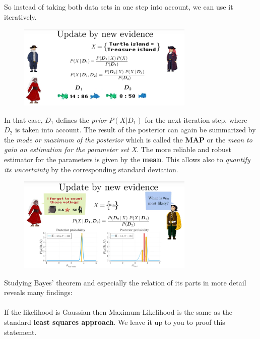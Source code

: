 \documentclass[12pt, a4paper]{scrartcl}
\begin{document}
So instead of taking both data sets in one step into account, we can use it
iteratively. %
 \begin{figure}[H]
	\centering
	\includegraphics[width=0.75\textwidth]{6_13.png}
\end{figure}
In that case, $D_1$ deﬁnes the \textit{prior} $P(X|D_1)$ for the next iteration step, where $D_2$ is
taken into account.
The result of the posterior can again be summarized by the \textit{mode or maximum of
the posterior} which is called the \textbf{MAP} or the\textit{ mean to gain an estimation for the parameter
set X}.
The more reliable and robust estimator for the parameters is given by the \textbf{mean}.
This allows also to \textit{quantify its uncertainty} by the corresponding standard
deviation.%
 \begin{figure}[H]
	\centering
	\includegraphics[width=0.75\textwidth]{6_14.png}
\end{figure}
Studying Bayes’ theorem and especially the relation of its parts in more detail
reveals many ﬁndings:\\%

\\

If the likelihood is Gaussian then Maximum-Likelihood is the same as
the standard \textbf{least squares approach}. We leave it up to you to proof
this statement.\\%
\end{document}
